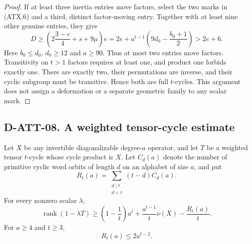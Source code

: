 \begin{proof}
If at least three inertia entries move factors, select the two
marks in (ATX.6) and a third, distinct factor-moving entry.
Together with at least nine other genuine entries, they give
\[
 D\ge\left(2\frac{3-c}{4}+s+9\mu\right)e
   =2e+a^{t-1}\left(9d_0-\frac{b_0+1}{2}\right)>2e+6.
 \tag{ATX.8}
\]
Here $b_0\le d_0$, $d_0\ge12$ and $a\ge90$.  Thus at most two
entries move factors.  Transitivity on $t>1$ factors requires at
least one, and product one forbids exactly one.  There are exactly
two, their permutations are inverse, and their cyclic subgroup
must be transitive.  Hence both are full $t$-cycles.  This argument
does not assign a deformation or a separate geometric family to
any scalar mark.
\end{proof}

\subsection*{D-ATT-08. A weighted tensor-cycle estimate}

\begin{lemma}[D-ATT-08]
Let $X$ be any invertible diagonalizable degree-$a$ operator, and let $T$ be
a weighted tensor $t$-cycle whose cycle product is $X$.
Let $C_d(a)$ denote the number of primitive cyclic word orbits
of length $d$ on an alphabet of size $a$, and put
\[
 R_t(a)=\sum_{\substack{d\mid t\\d<t}}(t-d)C_d(a).
 \tag{ATX.9}
\]
For every nonzero scalar $\lambda$,
\[
 \operatorname{rank}(1-\lambda T)
 \ge\left(1-\frac1t\right)a^t
       +\frac{a^{t-1}}t\nu(X)-\frac{R_t(a)}t.
 \tag{ATX.10}
\]
For $a\ge4$ and $t\ge3$,
\[
                             R_t(a)\le2a^{t-2}.
 \tag{ATX.11}
\]
\end{lemma}

